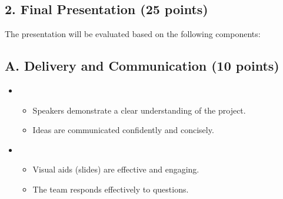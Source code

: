 \documentclass[letterpaper,10pt,english]{jupyterBook}
\begin{document}
\subsection{2. Final Presentation (25 points)}
\label{\detokenize{ProjectSyllabus:id3}}
\sphinxAtStartPar
The presentation will be evaluated based on the following components:


\subsection{A. Delivery and Communication (10 points)}
\label{\detokenize{ProjectSyllabus:id4}}\begin{itemize}
\item {} 
\sphinxAtStartPar
{}
\begin{itemize}
\item {} 
\sphinxAtStartPar
Speakers demonstrate a clear understanding of the project.

\item {} 
\sphinxAtStartPar
Ideas are communicated confidently and concisely.

\end{itemize}

\item {} 
\sphinxAtStartPar
{}
\begin{itemize}
\item {} 
\sphinxAtStartPar
Visual aids (slides) are effective and engaging.

\item {} 
\sphinxAtStartPar
The team responds effectively to questions.

\end{itemize}

\end{itemize}
\end{document}
